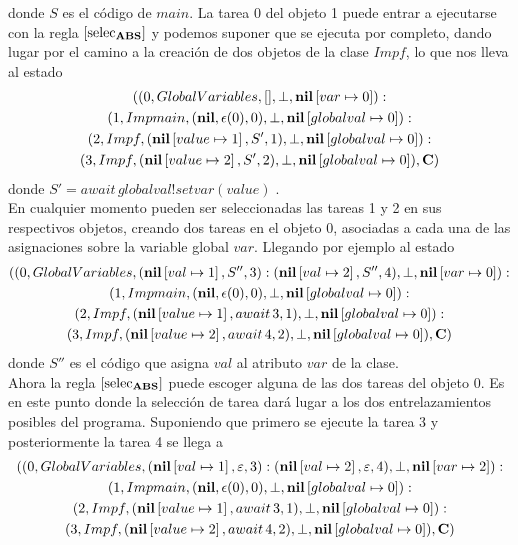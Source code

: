 donde $S$ es el código de $main$. La tarea 0 del objeto 1 puede entrar a ejecutarse con la regla $\left[ \text{selec}_{\text{\textbf{ABS}}} \right]$ y podemos suponer que se ejecuta por completo, dando lugar por el camino a la creación de dos objetos de la clase $Impf$, lo que nos lleva al estado
\begin{multline*}
  ((0, GlobalVariables, [], \perp, \textbf{nil}\left[ var\mapsto0 \right]):\\
  (1, Impmain, (\textbf{nil}, \epsilon(0), 0), \perp, \textbf{nil}\left[ globalval\mapsto0 \right]):\\
  (2, Impf, (\textbf{nil}\left[ value\mapsto1 \right], S', 1), \perp, \textbf{nil}\left[ globalval\mapsto0 \right]):\\
  (3, Impf ,(\textbf{nil}\left[ value\mapsto2 \right], S', 2), \perp, \textbf{nil}\left[ globalval\mapsto0 \right]), \mathbf{C})
\end{multline*}
donde $S' = await\, globalval!setvar(value)\;$.\\

En cualquier momento pueden ser seleccionadas las tareas 1 y 2 en sus respectivos objetos, creando dos tareas en el objeto 0, asociadas a cada una de las asignaciones sobre la variable global $var$. Llegando por ejemplo al estado
\begin{multline*}
  ((0, GlobalVariables, (\textbf{nil}\left[ val\mapsto1 \right], S'', 3):(\textbf{nil}\left[ val\mapsto2 \right], S'',4), \perp, \textbf{nil}\left[ var\mapsto0 \right]):\\
  (1, Impmain, (\textbf{nil}, \epsilon(0), 0), \perp, \textbf{nil}\left[ globalval\mapsto0 \right]):\\
  (2, Impf, (\textbf{nil}\left[ value\mapsto1 \right], await\,3, 1), \perp, \textbf{nil}\left[ globalval\mapsto0 \right]):\\
  (3, Impf ,(\textbf{nil}\left[ value\mapsto2 \right], await\,4, 2), \perp, \textbf{nil}\left[ globalval\mapsto0 \right]), \mathbf{C})
\end{multline*}
donde $S''$ es el código que asigna $val$ al atributo $var$ de la clase.\\

Ahora la regla $\left[ \text{selec}_{\text{\textbf{ABS}}} \right]$ puede escoger alguna de las dos tareas del objeto 0. Es en este punto donde la selección de tarea dará lugar a los dos entrelazamientos posibles del programa. Suponiendo que primero se ejecute la tarea 3 y posteriormente la tarea 4 se llega a
\begin{multline*}
  ((0, GlobalVariables, (\textbf{nil}\left[ val\mapsto1 \right], \varepsilon, 3):(\textbf{nil}\left[ val\mapsto2 \right], \varepsilon, 4), \perp, \textbf{nil}\left[ var\mapsto2 \right]):\\
  (1, Impmain, (\textbf{nil}, \epsilon(0), 0), \perp, \textbf{nil}\left[ globalval\mapsto0 \right]):\\
  (2, Impf, (\textbf{nil}\left[ value\mapsto1 \right], await\,3, 1), \perp, \textbf{nil}\left[ globalval\mapsto0 \right]):\\
  (3, Impf ,(\textbf{nil}\left[ value\mapsto2 \right], await\,4, 2), \perp, \textbf{nil}\left[ globalval\mapsto0 \right]), \mathbf{C})
\end{multline*}

